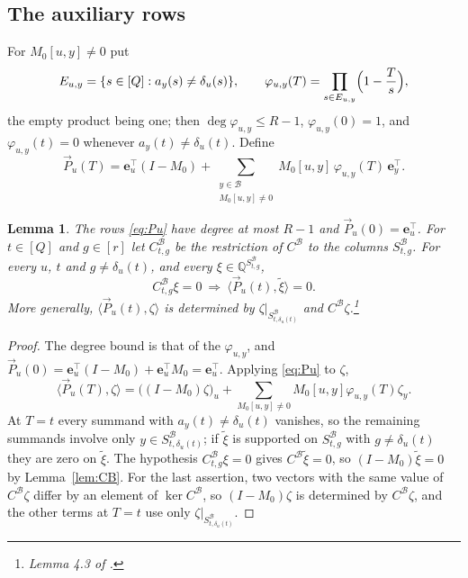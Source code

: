 \documentclass[11pt,reqno]{amsart}
\numberwithin{equation}{section}
\theoremstyle{plain}
\newtheorem{lemma}[theorem]{Lemma}
\theoremstyle{definition}
\theoremstyle{remark}
\newcommand{\B}{\mathcal{B}}
\newcommand{\Q}{\mathbb{Q}}
\newcommand{\e}{\mathbf{e}}
\newcommand{\PP}{\vec{P}}
\newcommand{\ip}[2]{\langle #1,#2\rangle}
\begin{document}
\subsection{The auxiliary rows}
For $M_0[u,y]\ne0$ put
\begin{equation}\label{eq:phi}
  E_{u,y}=\{s\in[Q]:a_y(s)\ne\delta_u(s)\},\qquad
  \varphi_{u,y}(T)=\prod_{s\in E_{u,y}}\Bigl(1-\frac Ts\Bigr),
\end{equation}
the empty product being one; then $\deg\varphi_{u,y}\le R-1$, $\varphi_{u,y}(0)=1$,
and $\varphi_{u,y}(t)=0$ whenever $a_y(t)\ne\delta_u(t)$. Define
\begin{equation}\label{eq:Pu}
  \PP_u(T)=\e_u^{\top}(I-M_0)+\sum_{\substack{y\in\B\\ M_0[u,y]\ne0}}M_0[u,y]\,\varphi_{u,y}(T)\,\e_y^{\top}.
\end{equation}

\begin{lemma}\label{lem:rows}
The rows \eqref{eq:Pu} have degree at most $R-1$ and $\PP_u(0)=\e_u^{\top}$. For
$t\in[Q]$ and $g\in[r]$ let $C^{\B}_{t,g}$ be the restriction of $C^{\B}$ to the
columns $S^{\B}_{t,g}$. For every $u$, $t$ and $g\ne\delta_u(t)$, and every
$\xi\in\Q^{S^{\B}_{t,g}}$,
\[
  C^{\B}_{t,g}\xi=0\ \Longrightarrow\ \ip{\PP_u(t)}{\tilde\xi}=0 .
\]
More generally, $\ip{\PP_u(t)}{\zeta}$ is determined by $\zeta|_{S^{\B}_{t,\delta_u(t)}}$
and $C^{\B}\zeta$.\footnote{Lemma 4.3 of \cite{OAI26}.}
\end{lemma}

\begin{proof}
The degree bound is that of the $\varphi_{u,y}$, and
$\PP_u(0)=\e_u^{\top}(I-M_0)+\e_u^{\top}M_0=\e_u^{\top}$. Applying
\eqref{eq:Pu} to $\zeta$,
\begin{equation}\label{eq:Puzeta}
  \ip{\PP_u(T)}{\zeta}=\bigl((I-M_0)\zeta\bigr)_u+\sum_{M_0[u,y]\ne0}M_0[u,y]\varphi_{u,y}(T)\zeta_y .
\end{equation}
At $T=t$ every summand with $a_y(t)\ne\delta_u(t)$ vanishes, so the remaining
summands involve only $y\in S^{\B}_{t,\delta_u(t)}$; if $\tilde\xi$ is supported on
$S^{\B}_{t,g}$ with $g\ne\delta_u(t)$ they are zero on $\tilde\xi$. The hypothesis
$C^{\B}_{t,g}\xi=0$ gives $C^{\B}\tilde\xi=0$, so $(I-M_0)\tilde\xi=0$ by
Lemma~\ref{lem:CB}. For the last assertion, two vectors with the same value of
$C^{\B}\zeta$ differ by an element of $\ker C^{\B}$, so $(I-M_0)\zeta$ is
determined by $C^{\B}\zeta$, and the other terms at $T=t$ use only
$\zeta|_{S^{\B}_{t,\delta_u(t)}}$.
\end{proof}
\end{document}
